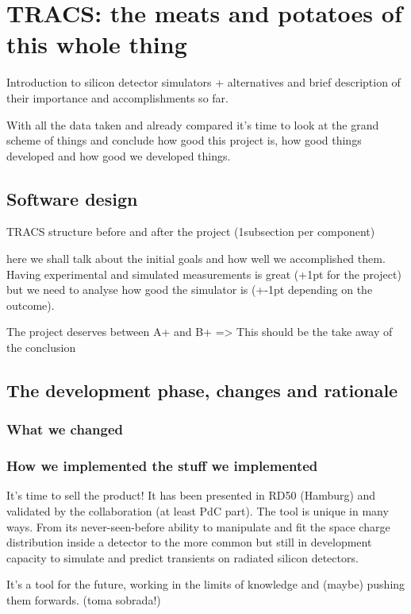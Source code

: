 \chapter{TRACS: the meats and potatoes of this whole thing}
\label{chap:Comp}

Introduction to silicon detector simulators + alternatives and brief description of their importance and accomplishments so far.

With all the data taken and already compared it's time to look at the grand scheme of things and conclude how good this project is, how good things developed and how good we developed things.

\section{Software design} %
\label{sec:results_and_achievements}

TRACS structure before and after the project (1subsection per component)

here we shall talk about the initial goals and how well we accomplished them. Having experimental and simulated measurements is great (+1pt for the project) but we need to analyse how good the simulator is (+-1pt depending on the outcome).

The project deserves between A+ and B+ => This should be the take away of the conclusion


\section{The development phase, changes and rationale} %
\label{sec:let_s_put_the_project_in_perspective}

\subsection{What we changed}

\subsection{How we implemented the stuff we implemented}

It's time to sell the product! It has been presented in RD50 (Hamburg) and validated by the collaboration (at least PdC part). The tool is unique in many ways. From its never-seen-before ability to manipulate and fit the space charge distribution inside a detector to the more common but still in development capacity to simulate and predict transients on radiated silicon detectors.

It's a tool for the future, working in the limits of knowledge and (maybe) pushing them forwards. (toma sobrada!)

